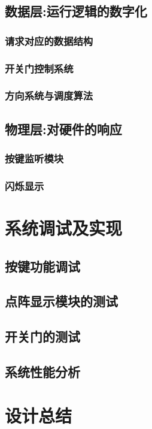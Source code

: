 \documentclass[pdfCover]{myreport} %
\begin{document}
  \subsection{数据层:运行逻辑的数字化}
    \subsubsection{请求对应的数据结构}
      
    \subsubsection{开关门控制系统}
      
    \subsubsection{方向系统与调度算法}
      


  \subsection{物理层:对硬件的响应}
    
    \subsubsection{按键监听模块}
      

    \subsubsection{闪烁显示}
      


\section{系统调试及实现}
  
  \subsection{按键功能调试}
    
  \subsection{点阵显示模块的测试}
    
  \subsection{开关门的测试}
    
  \subsection{系统性能分析}
    


\newpage
\section{设计总结}
  

\newpage

\nocite{*}
\end{document}

